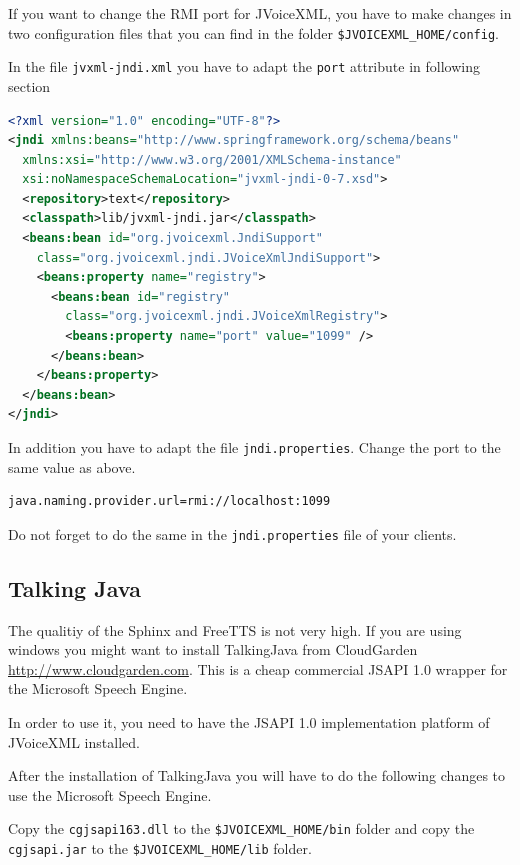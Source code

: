 \documentclass[11pt,a4paper]{article}
\begin{document}
If you want to change the RMI port for JVoiceXML, you have to make changes in 
two configuration files that you can find in the folder 
\texttt{\$JVOICE\-XML\_HOME/config}.

In the file \texttt{jvxml-jndi.xml} you have to adapt the \texttt{port} 
attribute in following section

\begin{lstlisting}[language=XML]
<?xml version="1.0" encoding="UTF-8"?>
<jndi xmlns:beans="http://www.springframework.org/schema/beans"
  xmlns:xsi="http://www.w3.org/2001/XMLSchema-instance"
  xsi:noNamespaceSchemaLocation="jvxml-jndi-0-7.xsd">
  <repository>text</repository>
  <classpath>lib/jvxml-jndi.jar</classpath>
  <beans:bean id="org.jvoicexml.JndiSupport"
    class="org.jvoicexml.jndi.JVoiceXmlJndiSupport">
    <beans:property name="registry">
      <beans:bean id="registry"
        class="org.jvoicexml.jndi.JVoiceXmlRegistry">
        <beans:property name="port" value="1099" />
      </beans:bean>
    </beans:property>
  </beans:bean>
</jndi>
\end{lstlisting}

In addition you have to adapt the file \texttt{jndi.properties}.
Change the port to the same value as above.

\begin{lstlisting}
java.naming.provider.url=rmi://localhost:1099
\end{lstlisting}

Do not forget to do the same in the \texttt{jndi.properties} file of your
clients.

\subsection{Talking Java}
\label{sec:talking-java}

The qualitiy of the Sphinx and FreeTTS is not very high. If you are using
windows you might want to install TalkingJava from CloudGarden
\url{http://www.cloudgarden.com}. This is a cheap commercial JSAPI 1.0 wrapper
for the Microsoft Speech Engine.

In order to use it, you need to have the JSAPI 1.0 implementation platform of
JVoiceXML installed.

After the installation of TalkingJava you will have to do
the following changes to use the Microsoft Speech Engine.

Copy the \lstinline{cgjsapi163.dll} to the \lstinline{$JVOICEXML_HOME/bin}
folder and copy the \lstinline{cgjsapi.jar} to the
\lstinline{$JVOICEXML_HOME/lib} folder.
\end{document}
